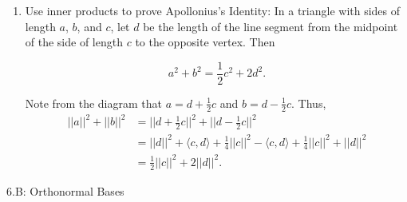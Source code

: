 \documentclass{book}
\begin{document}
\begin{enumerate}



\item Use inner products to prove Apollonius's Identity: In a triangle with sides of length \(a\), \(b\), and \(c\), let \(d\) be the length of the line segment from the midpoint of the side of length \(c\) to the opposite vertex.  Then 

\begin{equation*}
    a^2+b^2 = \frac{1}{2}c^2+2d^2.
\end{equation*}

Note from the diagram that \(a=d+\frac{1}{2}c\) and \(b=d-\frac{1}{2}c\).  Thus,
\begin{equation*}
    \begin{split}
        ||a||^2+||b||^2&=||d+\frac{1}{2}c||^2+||d-\frac{1}{2}c||^2 \\
        &=||d||^2+\langle c,d \rangle+\frac{1}{4}||c||^2-\langle c,d \rangle+\frac{1}{4}||c||^2+||d||^2 \\
        &=\frac{1}{2}||c||^2+2||d||^2.
    \end{split}
\end{equation*}

\end{enumerate}

6.B: Orthonormal Bases
\end{document}
